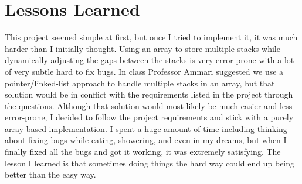 \documentclass[12pt]{report}
\begin{document}
\chapter{Lessons Learned}
This project seemed simple at first, but once I tried to implement it,
it was much harder than I initially thought. Using an array to store multiple
stacks while dynamically adjusting the gaps between the stacks is very error-prone 
with a lot of very subtle hard to fix bugs.
In class Professor Ammari suggested we use a pointer/linked-list approach to handle
multiple stacks in an array, but that solution would be in conflict with the requirements 
listed in the project through the questions. Although that solution would most likely be much
easier and less error-prone, I decided to follow the project requirements and stick with
a purely array based implementation. I spent a huge amount of time including thinking about 
fixing bugs while eating, showering, and even in my dreams, but when I finally fixed all the bugs 
and got it working, it was extremely satisfying.
The lesson I learned is that sometimes doing things the hard way 
could end up being better than the easy way.




 
\end{document}
